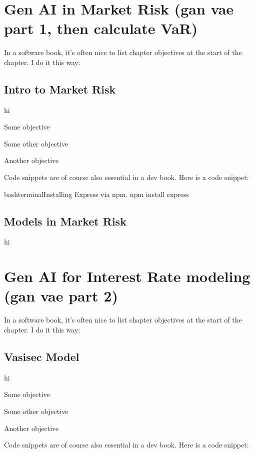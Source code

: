 \documentclass[a4paper,headinclude=on,footinclude=on,12pt,oneside]{scrbook}
\begin{document}
\chapter{Gen AI in Market Risk (gan vae part 1, then calculate VaR)}
In a software book, it's often nice to list chapter objectives at the start of the chapter. I do it this way:

\section{Intro to Market Risk}
hi
\begin{arrows}
	\item Some objective
	\item Some other objective
	\item Another objective
\end{arrows}


Code snippets are of course also essential in a dev book. Here is a code snippet:

\begin{codeInput}{bash}{terminal}{Installing Express via npm.}
	npm install express
\end{codeInput}

\section{Models in Market Risk }
hi

\chapter{Gen AI for Interest Rate modeling (gan vae part 2)}
In a software book, it's often nice to list chapter objectives at the start of the chapter. I do it this way:
\section{Vasisec Model}
hi

\begin{arrows}
	\item Some objective
	\item Some other objective
	\item Another objective
\end{arrows}


Code snippets are of course also essential in a dev book. Here is a code snippet:
\end{document}
